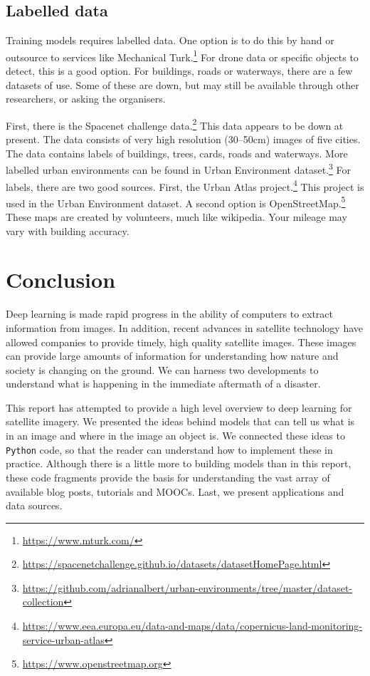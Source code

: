\documentclass[12pt, a4paper, oneside, headinclude, footinclude]{article}
\begin{document}
\subsection{Labelled data}

Training models requires labelled data. One option is to do this by hand or
outsource to services like Mechanical
Turk.\footnote{\url{https://www.mturk.com/}} For drone data or specific
objects to detect, this is a good option. For buildings, roads or waterways,
there are a few datasets of use. Some of these are down, but may still be
available through other researchers, or asking the organisers.

First, there is the Spacenet challenge
data.\footnote{\url{https://spacenetchallenge.github.io/datasets/datasetHomePage.html}}
This data appears to be down at present. The data consists of very high
resolution (30--50cm) images of five cities. The data contains labels of
buildings, trees, cards, roads and waterways. More labelled urban environments
can be found in Urban Environment
dataset.\footnote{\url{https://github.com/adrianalbert/urban-environments/tree/master/dataset-collection}}
For labels, there are two good sources. First, the Urban Atlas
project.\footnote{\url{https://www.eea.europa.eu/data-and-maps/data/copernicus-land-monitoring-service-urban-atlas}}
This project is used in the Urban Environment dataset. A second option is
OpenStreetMap.\footnote{\url{https://www.openstreetmap.org}} These maps are
created by volunteers, much like wikipedia. Your mileage may vary with
building accuracy. 

\section{Conclusion}

Deep learning is made rapid progress in the ability of computers to extract
information from images. In addition, recent advances in satellite technology
have allowed companies to provide timely, high quality satellite images. These
images can provide large amounts of information for understanding how nature
and society is changing on the ground. We can harness two developments to
understand what is happening in the immediate aftermath of a disaster.
 
This report has attempted to provide a high level overview to deep learning
for satellite imagery. We presented the ideas behind models that can tell us
what is in an image and where in the image an object is. 
We connected these ideas to \texttt{Python} code, so that the reader can
understand how to implement these in practice. Although there is a little more
to building models than in this report, these code fragments provide the basis
for understanding the vast array of available blog posts, tutorials and MOOCs.
Last, we present applications and data sources.
\end{document}

